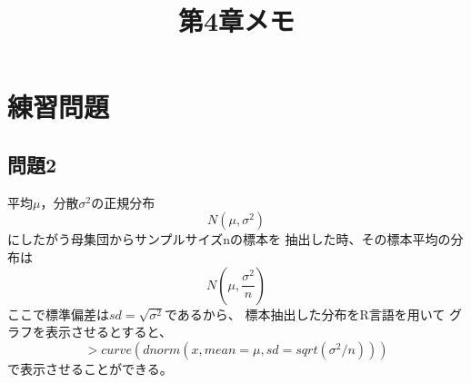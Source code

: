 \documentclass{jarticle}
\begin{document}
\title{第4章メモ}
\maketitle

\section{練習問題}
\subsection{問題2}
平均${\mu}$，分散${\sigma}^2$の正規分布
\[
 N(\mu, \sigma^2)
\]
にしたがう母集団からサンプルサイズnの標本を
抽出した時、その標本平均の分布は
\[
 N \left(\mu, \frac{\sigma^2}{n} \right)
\]
ここで標準偏差は$sd=\sqrt{\sigma^2}$であるから、
標本抽出した分布をR言語を用いて
グラフを表示させるとすると、
\[
 > curve(dnorm(x, mean=\mu, sd=sqrt(\sigma^2/n)))
 \]
で表示させることができる。
\end{document}

